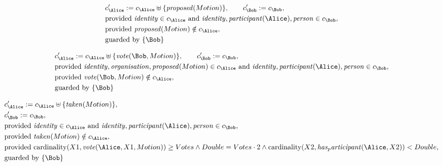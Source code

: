 \begin{align*}
&
c'_
{
\Alice
}
 := 
c_
{
\Alice
}
 \uplus 
\{
\mathit{
proposed
}
(
Motion
)
\}
, \qquad 
c'_
{
\Bob
}
 := 
c_
{
\Bob
}
,\\
&
\text{provided } 
\mathit{
identity
}
 \in c_
{
\Alice
}
 \text{ and } 
\mathit{
identity
}
,
\mathit{
participant
}
(
\Alice
)
,
\mathit{
person
}
 \in c_
{
\Bob
}
,\\
&
\text{provided } 
\mathit{
proposed
}
(
Motion
)
 \notin c_
{
\Alice
}
,\\
&
\text{guarded by } \{
\Bob
\}
\end{align*}

\begin{align*}
&
c'_
{
\Alice
}
 := 
c_
{
\Alice
}
 \uplus 
\{
\mathit{
vote
}
(
\Bob
,
Motion
)
\}
, \qquad 
c'_
{
\Bob
}
 := 
c_
{
\Bob
}
,\\
&
\text{provided } 
\mathit{
identity
}
,
\mathit{
organisation
}
,
\mathit{
proposed
}
(
Motion
)
 \in c_
{
\Alice
}
 \text{ and } 
\mathit{
identity
}
,
\mathit{
participant
}
(
\Alice
)
,
\mathit{
person
}
 \in c_
{
\Bob
}
,\\
&
\text{provided } 
\mathit{
vote
}
(
\Bob
,
Motion
)
 \notin c_
{
\Alice
}
,\\
&
\text{guarded by } \{
\Bob
\}
\end{align*}

\begin{align*}
&
c'_
{
\Alice
}
 := 
c_
{
\Alice
}
 \uplus 
\{
\mathit{
taken
}
(
Motion
)
\}
,\\
&
c'_
{
\Bob
}
 := 
c_
{
\Bob
}
,\\
&
\text{provided } 
\mathit{
identity
}
 \in c_
{
\Alice
}
 \text{ and } 
\mathit{
identity
}
,
\mathit{
participant
}
(
\Alice
)
,
\mathit{
person
}
 \in c_
{
\Bob
}
,\\
&
\text{provided } 
\mathit{
taken
}
(
Motion
)
 \notin c_
{
\Alice
}
,\\
&
\text{provided } 
\mathrm{cardinality}(
X1
,
\mathit{
vote
}
(
\Alice
,
X1
,
Motion
)
)
\ge
Votes
\land
Double
=
Votes
\cdot
2
\land
\mathrm{cardinality}(
X2
,
\mathit{
has_participant
}
(
\Alice
,
X2
)
)
<
Double
,\\
&
\text{guarded by } \{
\Bob
\}
\end{align*}

